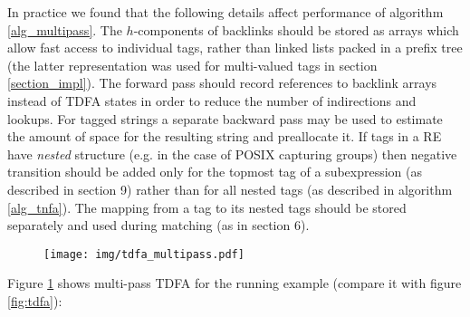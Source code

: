 \documentclass[]{article}
\begin{document}
In practice we found that the following details affect performance of algorithm \ref{alg_multipass}.
The $h$-components of backlinks should be stored as arrays which allow fast access to individual tags,
rather than linked lists packed in a prefix tree (the latter representation was used for multi-valued tags in section \ref{section_impl}).
The forward pass should record references to backlink arrays instead of TDFA states in order to reduce the number of indirections and lookups.
For tagged strings a separate backward pass may be used to estimate the amount of space for the resulting string and preallocate it.
If tags in a RE have \emph{nested} structure (e.g. in the case of POSIX capturing groups)
then negative transition should be added only for the topmost tag of a subexpression (as described in \cite{BorTro19} section 9)
rather than for all nested tags (as described in algorithm \ref{alg_tnfa}).
The mapping from a tag to its nested tags should be stored separately and used during matching (as in \cite{BorTro19} section 6).
\medskip

\begin{figure}[b]
\texttt{[image: img/tdfa\_multipass.pdf]}
\vspace{0.5em}
\label{fig:tdfa_multipass}
\end{figure}
\medskip

Figure \ref{fig:tdfa_multipass} shows multi-pass TDFA for the running example (compare it with figure \ref{fig:tdfa}):
\medskip
\end{document}
